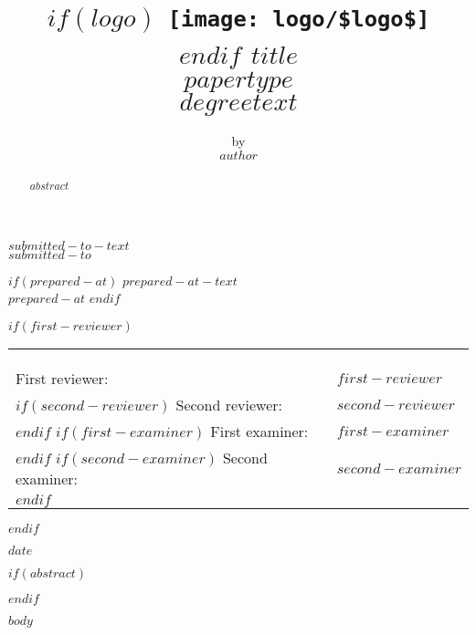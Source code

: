 \documentclass[11pt,a4paper,twoside,openright,openbib]{memoir}
\author{
  \small{by} \vspace{.5cm} 											\\
	\Large{\textbf{$author$}}}
\title{
	\textbf{\vspace{-2.5cm}
	$if(logo)$
	  \texttt{[image: logo/\$logo\$]} \\
	$endif$
	\vspace{3cm}\Huge{$title$} }\\
	\vspace{1cm}
	\Large{\textbf{$papertype$}}\\
	\vspace{0.2cm}
	\normalsize{$degreetext$}}
\date{}
\begin{document}
\frontmatter

\begin{titlingpage}
  \begin{center}
    \maketitle
    \vspace{-1cm}
    \small{$submitted-to-text$} \\
    \small{$submitted-to$}

    $if(prepared-at)$
    \vspace{0.5cm}
    \small{$prepared-at-text$} \\
    \small{$prepared-at$}
    $endif$

    $if(first-reviewer)$
    \begin{tabular}{ll}
    & \\
    & \\
    & \\
    First reviewer: & $first-reviewer$ \\
    $if(second-reviewer)$
    Second reviewer: & $second-reviewer$ \\
    $endif$
    $if(first-examiner)$
    First examiner: & $first-examiner$ \\
    $endif$
    $if(second-examiner)$
    Second examiner: & $second-examiner$ \\
    $endif$
    & \\
    \end{tabular}
    $endif$

    \vspace{\fill}
    \small{$date$}
  \end{center}
\end{titlingpage}

\setcounter{page}{1}

$if(abstract)$
  \abstractintoc
  \abstractnum
  \begin{abstract}
  $abstract$
  \end{abstract}
$endif$

\cleardoublepage

\tableofcontents*

\cleardoublepage

\listoffigures

\mainmatter
$body$
\end{document}
